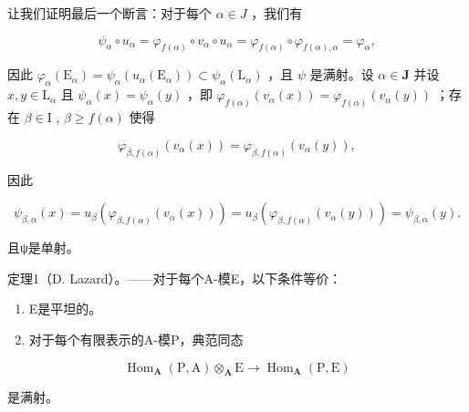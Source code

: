 让我们证明最后一个断言：对于每个 \(\alpha \in J\) ，我们有

\[
\psi_ {\alpha} \circ u _ {\alpha} = \varphi_ {f (\alpha)} \circ v _ {\alpha} \circ u _ {\alpha} = \varphi_ {f (\alpha)} \circ \varphi_ {f (\alpha), \alpha} = \varphi_ {\alpha},
\]

因此 \(\varphi_{\alpha}(\mathrm{E}_{\alpha}) = \psi_{\alpha}(u_{\alpha}(\mathrm{E}_{\alpha})) \subset \psi_{\alpha}(\mathrm{L}_{\alpha})\) ，且 \(\psi\) 是满射。设 \(\alpha \in \mathbf{J}\) 并设 \(x, y \in \mathrm{L}_{\alpha}\) 且 \(\psi_{\alpha}(x) = \psi_{\alpha}(y)\) ，即 \(\varphi_{f(\alpha)}(v_{\alpha}(x)) = \varphi_{f(\alpha)}(v_{\alpha}(y))\) ；存在 \(\beta \in \mathrm{I}\) , \(\beta \geqslant f(\alpha)\) 使得

\[
\varphi_ {\beta , f (\alpha)} (v _ {\alpha} (x)) = \varphi_ {\beta , f (\alpha)} (v _ {\alpha} (y)),
\]

因此

\[
\psi_ {\beta , \alpha} (x) = u _ {\beta} (\varphi_ {\beta , f (\alpha)} (v _ {\alpha} (x))) = u _ {\beta} (\varphi_ {\beta , f (\alpha)} (v _ {\alpha} (y))) = \psi_ {\beta , \alpha} (y).
\]

且ψ是单射。

定理1（D. Lazard）。——对于每个A-模E，以下条件等价：

\begin{enumerate}
\def\labelenumi{(\roman{enumi})}
\item
  E是平坦的。
\item
  对于每个有限表示的A-模P，典范同态
\end{enumerate}

\[
\operatorname{Hom} _ {\mathbf {A}} (\mathrm{P}, \mathrm{A}) \otimes_ {\mathbf {A}} \mathrm{E} \rightarrow \operatorname{Hom} _ {\mathbf {A}} (\mathrm{P}, \mathrm{E})
\]

是满射。

